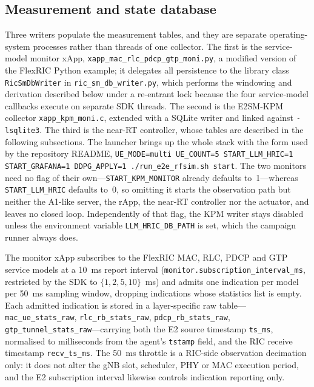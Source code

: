 \subsection{Measurement and state database}
Three writers populate the measurement tables, and they are separate operating-system processes rather than threads of one collector. The first is the service-model monitor xApp, \texttt{xapp\_mac\_rlc\_pdcp\_gtp\_moni.py}, a modified version of the FlexRIC Python example; it delegates all persistence to the library class \texttt{RicSmDbWriter} in \texttt{ric\_sm\_db\_writer.py}, which performs the windowing and derivation described below under a re-entrant lock because the four service-model callbacks execute on separate SDK threads. The second is the E2SM-KPM collector \texttt{xapp\_kpm\_moni.c}, extended with a SQLite writer and linked against \texttt{-lsqlite3}. The third is the near-RT controller, whose tables are described in the following subsections. The launcher brings up the whole stack with the form used by the repository README, \texttt{UE\_MODE=multi UE\_COUNT=5 START\_LLM\_HRIC=1 START\_GRAFANA=1 DDPG\_APPLY=1 ./run\_e2e\_rfsim.sh start}. The two monitors need no flag of their own---\texttt{START\_KPM\_MONITOR} already defaults to~1---whereas \texttt{START\_LLM\_HRIC} defaults to~0, so omitting it starts the observation path but neither the A1-like server, the rApp, the near-RT controller nor the actuator, and leaves no closed loop. Independently of that flag, the KPM writer stays disabled unless the environment variable \texttt{LLM\_HRIC\_DB\_PATH} is set, which the campaign runner always does.

The monitor xApp subscribes to the FlexRIC MAC, RLC, PDCP and GTP service models at a 10~ms report interval (\texttt{monitor.subscription\_interval\_ms}, restricted by the SDK to $\{1,2,5,10\}$~ms) and admits one indication per model per 50~ms sampling window, dropping indications whose statistics list is empty. Each admitted indication is stored in a layer-specific raw table---\texttt{mac\_ue\_stats\_raw}, \texttt{rlc\_rb\_stats\_raw}, \texttt{pdcp\_rb\_stats\_raw}, \texttt{gtp\_tunnel\_stats\_raw}---carrying both the E2 source timestamp \texttt{ts\_ms}, normalised to milliseconds from the agent's \texttt{tstamp} field, and the RIC receive timestamp \texttt{recv\_ts\_ms}. The 50~ms throttle is a RIC-side observation decimation only: it does not alter the gNB slot, scheduler, PHY or MAC execution period, and the E2 subscription interval likewise controls indication reporting only.

